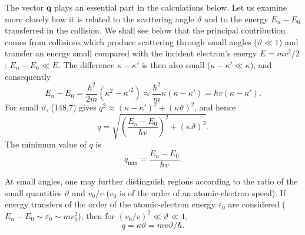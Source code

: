 The vector $\mathbf q$ plays an essential part in the calculations below.
Let us examine more closely how it is related to the scattering angle
$\vartheta$ and to the energy $E_n-E_0$ transferred in the collision. We
shall see below that the principal contribution comes from collisions which
produce scattering through small angles ($\vartheta\ll1$) and transfer an
energy small compared with the incident electron's energy $E=mv^2/2$:
$E_n-E_0\ll E$. The difference $\kappa-\kappa'$ is then also small
($\kappa-\kappa'\ll\kappa$), and consequently
\[
 E_n-E_0=\frac{\hbar^2}{2m}(\kappa^2-\kappa'^2)
 \approx\frac{\hbar^2}{m}\kappa(\kappa-\kappa')
 =\hbar v(\kappa-\kappa').
\]
For small $\vartheta$, (148.7) gives
$q^2\approx(\kappa-\kappa')^2+(\kappa\vartheta)^2$, and hence
\begin{equation}
 q=\sqrt{\left(\frac{E_n-E_0}{\hbar v}\right)^2+(\kappa\vartheta)^2}.
 \tag{148.10}
\end{equation}
The minimum value of $q$ is
\begin{equation}
 q_{\min}=\frac{E_n-E_0}{\hbar v}.
 \tag{148.11}
\end{equation}

At small angles, one may further distinguish regions according to the ratio
of the small quantities $\vartheta$ and $v_0/v$ ($v_0$ is of the order of an
atomic-electron speed). If energy transfers of the order of the
atomic-electron energy $\varepsilon_0$ are considered
($E_n-E_0\sim\varepsilon_0\sim mv_0^2$), then for
$(v_0/v)^2\ll\vartheta\ll1$,
\begin{equation}
 q=\kappa\vartheta=mv\vartheta/\hbar.
 \tag{148.12}
\end{equation}


